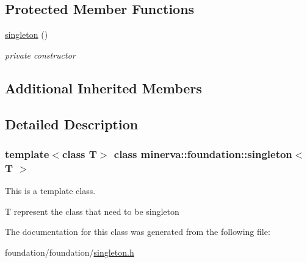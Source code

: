 \subsection*{Protected Member Functions}
\begin{DoxyCompactItemize}
\item 
\mbox{\label{classminerva_1_1foundation_1_1singleton_ad300ebe4f0d5ebc93c701667b4275984}} 
\hyperlink{classminerva_1_1foundation_1_1singleton_ad300ebe4f0d5ebc93c701667b4275984}{singleton} ()
\begin{DoxyCompactList}\small\item\em private constructor \end{DoxyCompactList}\end{DoxyCompactItemize}
\subsection*{Additional Inherited Members}


\subsection{Detailed Description}
\subsubsection*{template$<$class T$>$\newline
class minerva\+::foundation\+::singleton$<$ T $>$}

This is a template class. 

T represent the class that need to be singleton 

The documentation for this class was generated from the following file\+:\begin{DoxyCompactItemize}
\item 
foundation/foundation/\hyperlink{singleton_8h}{singleton.\+h}\end{DoxyCompactItemize}
